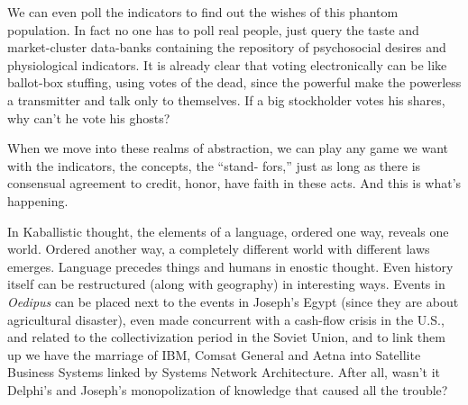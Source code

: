We can even poll the indicators to find out the wishes of this phantom population. In fact no one has to poll real people, just query the taste and market-cluster data-banks containing the repository of psychosocial desires and physiological indicators. It is already clear that voting electronically can be like ballot-box stuffing, using votes of the dead, since the powerful make the powerless a transmitter and talk only to themselves. If a big stockholder votes his shares, why can't he vote his ghosts?

When we move into these realms of abstraction, we can play any game we want with the indicators, the concepts, the \enquote{stand- fors,} just as long as there is consensual agreement to credit, honor, have faith in these acts. And this is what's happening.

In Kaballistic thought, the elements of a language, ordered one way, reveals one world. Ordered another way, a completely different world with different laws emerges. Language precedes things and humans in enostic thought. Even history itself can be restructured (along with geography) in interesting ways. Events in \emph{Oedipus} can be placed next to the events in Joseph's Egypt (since they are about agricultural disaster), even made concurrent with a cash-flow crisis in the U.S., and related to the collectivization period in the Soviet Union, and to link them up we have the marriage of IBM, Comsat General and Aetna into Satellite Business Systems linked by Systems Network Architecture. After all, wasn't it Delphi's and Joseph's monopolization of knowledge that caused all the trouble?
